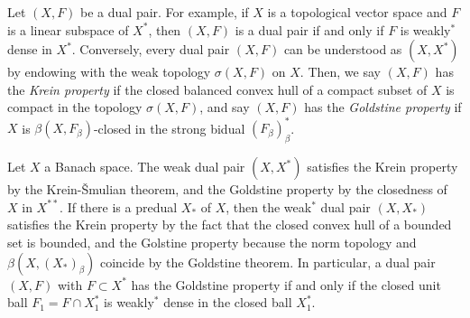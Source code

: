\documentclass{../../../small}
\begin{document}
\begin{defn}
Let $(X,F)$ be a dual pair.
For example, if $X$ is a topological vector space and $F$ is a linear subspace of $X^*$, then $(X,F)$ is a dual pair if and only if $F$ is weakly$^*$ dense in $X^*$.
Conversely, every dual pair $(X,F)$ can be understood as $(X,X^*)$ by endowing with the weak topology $\sigma(X,F)$ on $X$.
Then, we say $(X,F)$ has the \emph{Krein property} if the closed balanced convex hull of a compact subset of $X$ is compact in the topology $\sigma(X,F)$, and say $(X,F)$ has the \emph{Goldstine property} if $X$ is $\beta(X,F_\beta)$-closed in the strong bidual $(F_\beta)^*_\beta$.
\end{defn}
\begin{rmk*}
Let $X$ a Banach space.
The weak dual pair $(X,X^*)$ satisfies the Krein property by the Krein-\v Smulian theorem, and the Goldstine property by the closedness of $X$ in $X^{**}$.
If there is a predual $X_*$ of $X$, then the weak$^*$ dual pair $(X,X_*)$ satisfies the Krein property by the fact that the closed convex hull of a bounded set is bounded, and the Golstine property because the norm topology and $\beta(X,(X_*)_\beta)$ coincide by the Goldstine theorem.
In particular, a dual pair $(X,F)$ with $F\subset X^*$ has the Goldstine property if and only if the closed unit ball $F_1=F\cap X^*_1$ is weakly$^*$ dense in the closed ball $X^*_1$.
\end{rmk*}
\end{document}
